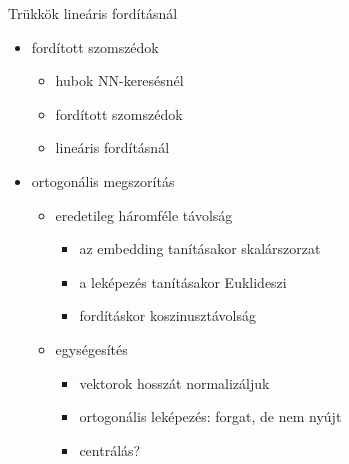 \documentclass{beamer}
\begin{document}

\begin{frame}[allowframebreaks]{Trükkök lineáris fordításnál}
  \begin{itemize}
    \item fordított szomszédok
      \begin{itemize}
        \item hubok NN-keresésnél \citep{Radovanovic:2010}
        \item fordított szomszédok \citep{Singh:2003}
        \item lineáris fordításnál \citep{Dinu:2015,Lazaridou:2015}
      \end{itemize}
    \item ortogonális megszorítás
      \begin{itemize}
        \item eredetileg háromféle távolság 
          \begin{itemize}
            \item az embedding tanításakor skalárszorzat
            \item a leképezés tanításakor Euklideszi
            \item fordításkor koszinusztávolság
          \end{itemize}
        \item egységesítés \citep{Xing:2015,Faruqui:2014,Artetxe:2016}
          \begin{itemize}
            \item vektorok hosszát normalizáljuk
            \item ortogonális leképezés: forgat, de nem nyújt
            \item centrálás?
          \end{itemize}
      \end{itemize}
  \end{itemize}
\end{frame}
\end{document}
